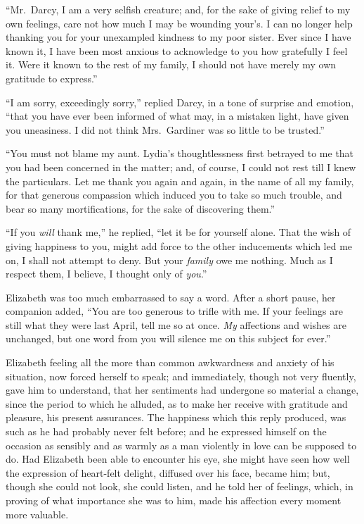 “Mr.\ Darcy, I am a very selfish creature; and, for the
sake of giving relief to my own feelings, care not how
much I may be wounding your’s. I can no longer help
thanking you for your unexampled kindness to my poor
sister. Ever since I have known it, I have been most
anxious to acknowledge to you how gratefully I feel it.
Were it known to the rest of my family, I should not have
merely my own gratitude to express.”

“I am sorry, exceedingly sorry,” replied Darcy, in
a tone of surprise and emotion, “that you have ever
been informed of what may, in a mistaken light, have
given you uneasiness. I did not think Mrs.\ Gardiner was
so little to be trusted.”

“You must not blame my aunt. Lydia’s thoughtlessness
first betrayed to me that you had been concerned
in the matter; and, of course, I could not rest till I knew
the particulars. Let me thank you again and again, in
the name of all my family, for that generous compassion
which induced you to take so much trouble, and bear so
many mortifications, for the sake of discovering them.”

“If you \textit{will} thank me,” he replied, “let it be for yourself
alone. That the wish of giving happiness to you, might
add force to the other inducements which led me on, I shall
not attempt to deny. But your \textit{family} owe me nothing.
Much as I respect them, I believe, I thought only of \textit{you}.”

Elizabeth was too much embarrassed to say a word.
After a short pause, her companion added, “You are too
generous to trifle with me. If your feelings are still what
they were last April, tell me so at once. \textit{My} affections
and wishes are unchanged, but one word from you will
silence me on this subject for ever.”

Elizabeth feeling all the more than common awkwardness
and anxiety of his situation, now forced herself to
speak; and immediately, though not very fluently, gave
him to understand, that her sentiments had undergone so
material a change, since the period to which he alluded,
as to make her receive with gratitude and pleasure, his
present assurances. The happiness which this reply
produced, was such as he had probably never felt before;
and he expressed himself on the occasion as sensibly and
as warmly as a man violently in love can be supposed to
do. Had Elizabeth been able to encounter his eye, she
might have seen how well the expression of heart-felt
delight, diffused over his face, became him; but, though
she could not look, she could listen, and he told her of
feelings, which, in proving of what importance she was
to him, made his affection every moment more valuable.

